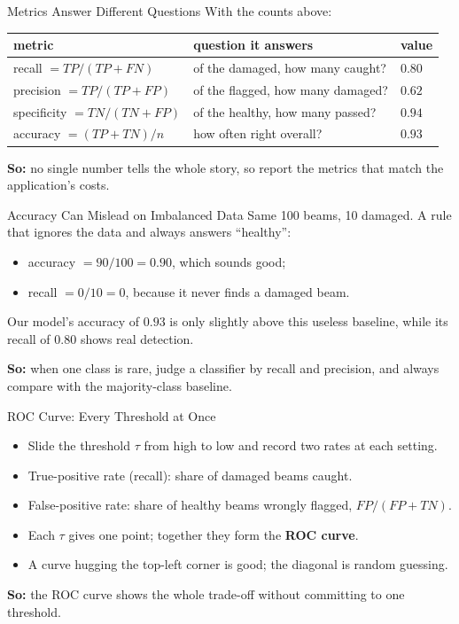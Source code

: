\documentclass{ntuabeamer}
\newcommand{\takeaway}[1]{\par\vspace{0.3cm}\begingroup\raggedright\noindent
  {\color{courseblue}\textbf{So:}} #1\par\endgroup}
\begin{document}
\begin{frame}{Metrics Answer Different Questions}
  With the counts above:
  \begin{center}
    \footnotesize\setlength{\tabcolsep}{3pt}
    \begin{tabular}{lll}
      \toprule
      metric & question it answers & value \\
      \midrule
      recall $=TP/(TP+FN)$ & of the damaged, how many caught? & $0.80$ \\
      precision $=TP/(TP+FP)$ & of the flagged, how many damaged? & $0.62$ \\
      specificity $=TN/(TN+FP)$ & of the healthy, how many passed? & $0.94$ \\
      accuracy $=(TP+TN)/n$ & how often right overall? & $0.93$ \\
      \bottomrule
    \end{tabular}
  \end{center}
  \takeaway{no single number tells the whole story, so report the metrics that match the application's costs.}
\end{frame}

\begin{frame}{Accuracy Can Mislead on Imbalanced Data}
  Same 100 beams, 10 damaged. A rule that ignores the data and always answers ``healthy'':
  \begin{itemize}
    \item accuracy $=90/100=0.90$, which sounds good;
    \item recall $=0/10=0$, because it never finds a damaged beam.
  \end{itemize}
  Our model's accuracy of $0.93$ is only slightly above this useless baseline, while its recall of $0.80$ shows real detection.
  \takeaway{when one class is rare, judge a classifier by recall and precision, and always compare with the majority-class baseline.}
\end{frame}

\begin{frame}{ROC Curve: Every Threshold at Once}
  \begin{itemize}
    \item Slide the threshold $\tau$ from high to low and record two rates at each setting.
    \item True-positive rate (recall): share of damaged beams caught.
    \item False-positive rate: share of healthy beams wrongly flagged, $FP/(FP+TN)$.
    \item Each $\tau$ gives one point; together they form the \textbf{ROC curve}.
    \item A curve hugging the top-left corner is good; the diagonal is random guessing.
  \end{itemize}
  \takeaway{the ROC curve shows the whole trade-off without committing to one threshold.}
\end{frame}
\end{document}
